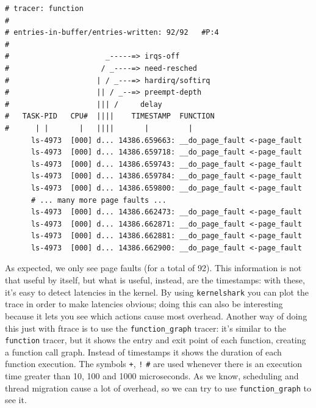 \begin{Verbatim}
# tracer: function
#
# entries-in-buffer/entries-written: 92/92   #P:4
#
#                      _-----=> irqs-off
#                     / _----=> need-resched
#                    | / _---=> hardirq/softirq
#                    || / _--=> preempt-depth
#                    ||| /     delay
#   TASK-PID   CPU#  ||||    TIMESTAMP  FUNCTION
#      | |       |   ||||       |         |
      ls-4973  [000] d... 14386.659663: __do_page_fault <-page_fault
      ls-4973  [000] d... 14386.659718: __do_page_fault <-page_fault
      ls-4973  [000] d... 14386.659743: __do_page_fault <-page_fault
      ls-4973  [000] d... 14386.659784: __do_page_fault <-page_fault
      ls-4973  [000] d... 14386.659800: __do_page_fault <-page_fault
      # ... many more page faults ...
      ls-4973  [000] d... 14386.662473: __do_page_fault <-page_fault
      ls-4973  [000] d... 14386.662871: __do_page_fault <-page_fault
      ls-4973  [000] d... 14386.662881: __do_page_fault <-page_fault
      ls-4973  [000] d... 14386.662900: __do_page_fault <-page_fault
\end{Verbatim}
As expected, we only see page faults (for a total of 92). This information is not that useful by itself, but what is useful, instead, are the timestamps: with these, it's easy to detect latencies in the kernel. By using \verb|kernelshark| you can plot the trace in order to make latencies obvious; doing this can also be interesting because it lets you see which actions cause most overhead. Another way of doing this just with ftrace is to use the \verb|function_graph| tracer: it's similar to the \verb|function| tracer, but it shows the entry and exit point of each function, creating a function call graph. Instead of timestamps it shows the duration of each function execution. The symbols \verb|+|, \verb|!| \verb|#| are used whenever there is an execution time greater than 10, 100 and 1000 microseconds. As we know, scheduling and thread migration cause a lot of overhead, so we can try to use \verb|function_graph| to see it.
